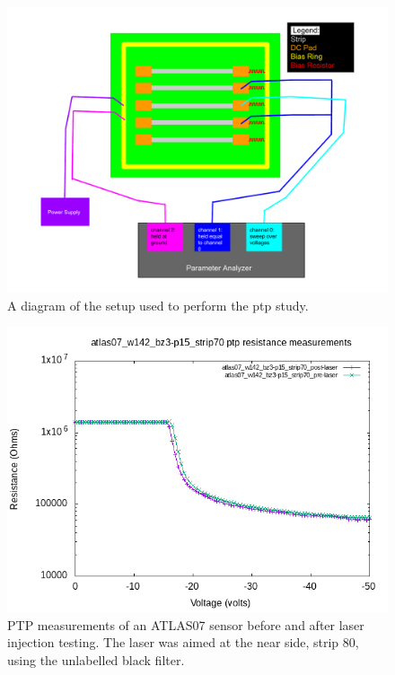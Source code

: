 \documentclass{report}
\begin{document}
            \begin{figure}[h] 
                \includegraphics[height=\textheight]{ptp_diagram}
                \centering
                \caption{ A diagram of the setup used to perform the ptp study. }
                \label{fig:ptp_diagram}
            \end{figure}

            \begin{figure}[h] 
                \includegraphics[height=.4\textheight]{atlas07_w142_bz3-p15_strip70_resistance_plots}
                \centering
                \caption{ PTP measurements of an ATLAS07 sensor before and after laser injection testing. The laser was aimed at the near side, strip 80, using the unlabelled black filter. }
                \label{fig:atlas07_w142_bz3-p15_strip70_resistance_plots}
            \end{figure}
\end{document}
